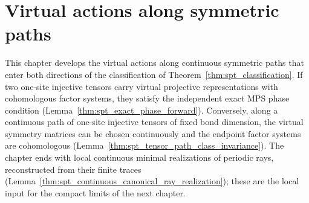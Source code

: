 \chapter{Virtual actions along symmetric paths}
\label{ch:symmetry_spt_virtual_paths}

This chapter develops the virtual actions along continuous symmetric paths
that enter both directions of the classification of
Theorem~\ref{thm:spt_classification}. If two one-site injective tensors carry
virtual projective representations with cohomologous factor systems, they
satisfy the independent exact MPS phase condition
(Lemma~\ref{thm:spt_exact_phase_forward}). Conversely, along a continuous path
of one-site injective tensors of fixed bond dimension, the virtual symmetry
matrices can be chosen continuously and the endpoint factor systems are
cohomologous (Lemma~\ref{thm:spt_tensor_path_class_invariance}). The chapter
ends with local continuous minimal realizations of periodic rays, reconstructed
from their finite traces
(Lemma~\ref{thm:spt_continuous_canonical_ray_realization}); these are the
local input for the compact limits of the next chapter.


